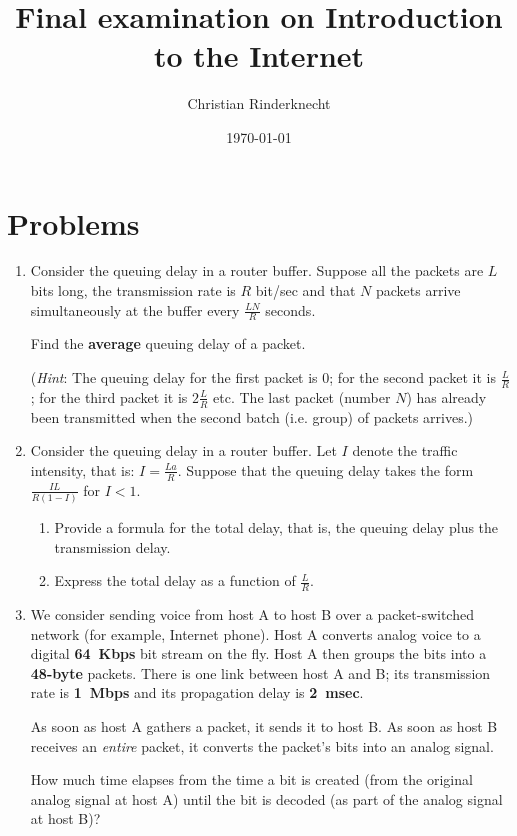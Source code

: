 \documentclass[12pt,a4paper]{article}
\title{Final examination on Introduction to the Internet}
\author{Christian Rinderknecht}
\date{\today}
\begin{document}
\maketitle

\section{Problems}

\begin{enumerate}

  \item Consider the queuing delay in a router buffer. Suppose all the
    packets are \(L\) bits long, the transmission rate is \(R\)
    bit/sec and that \(N\) packets arrive simultaneously at the buffer
    every \(\frac{LN}{R}\) seconds.

    Find the \textbf{average} queuing delay of a packet.

    (\emph{Hint}: The queuing delay for the first packet is 0; for the
    second packet it is \(\frac{L}{R}\); for the third packet it is
    \(2{\frac{L}{R}}\) etc. The last packet (number \(N\)) has already
    been transmitted when the second batch (i.e. group) of packets
    arrives.)

  \item Consider the queuing delay in a router buffer. Let \(I\)
    denote the traffic intensity, that is: \(I =
    \frac{La}{R}\). Suppose that the queuing delay takes the form
    \(\frac{IL}{R(1-I)}\) for \(I < 1\).
    \begin{enumerate}

      \item Provide a formula for the total delay, that is, the
        queuing delay plus the transmission delay.

      \item Express the total delay as a function of \(\frac{L}{R}\).

    \end{enumerate}

  \item We consider sending voice from host A to host B over a
    packet-switched network (for example, Internet phone). Host A
    converts analog voice to a digital \textbf{64~Kbps} bit stream on
    the fly. Host A then groups the bits into a \textbf{48-byte}
    packets. There is one link between host A and B; its transmission
    rate is \textbf{1~Mbps} and its propagation delay is
    \textbf{2~msec}.

    As soon as host A gathers a packet, it sends it to host B. As soon
    as host B receives an \emph{entire} packet, it converts the
    packet's bits into an analog signal.

    How much time elapses from the time a bit is created (from the
    original analog signal at host A) until the bit is decoded (as
    part of the analog signal at host B)?

\end{enumerate}
\end{document}
